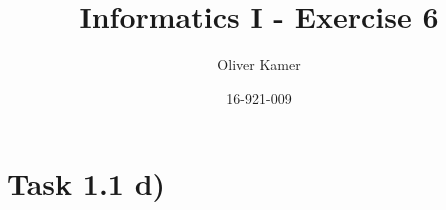 \documentclass[11pt,a4paper]{article}
\author{Oliver Kamer}
\title{Informatics I - Exercise 6}
\date{16-921-009}
\begin{document}
	\maketitle
	
	\section*{Task 1.1 d)}
				
\end{document}

